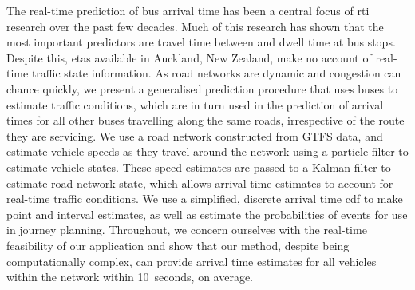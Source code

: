 The real-time prediction of bus arrival time has been a central focus of \gls{rti} research over the past few decades. Much of this research has shown that the most important predictors are travel time between and dwell time at bus stops. Despite this, \glspl{eta} available in Auckland, New Zealand, make no account of real-time traffic state information. As road networks are dynamic and congestion can chance quickly, we present a generalised prediction procedure that uses buses to estimate traffic conditions, which are in turn used in the prediction of arrival times for all other buses travelling along the same roads, irrespective of the route they are servicing. We use a road network constructed from GTFS data, and estimate vehicle speeds as they travel around the network using a particle filter to estimate vehicle states. These speed estimates are passed to a Kalman filter to estimate road network state, which allows arrival time estimates to account for real-time traffic conditions. We use a simplified, discrete arrival time \gls{cdf} to make point and interval estimates, as well as estimate the probabilities of events for use in journey planning. Throughout, we concern ourselves with the real-time feasibility of our application and show that our method, despite being computationally complex, can provide arrival time estimates for all vehicles within the network within 10~seconds, on average.
